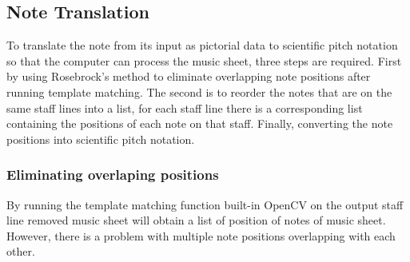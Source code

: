 \documentclass[final]{cvpr}
\begin{document}

\subsection{Note Translation}

To translate the note from its input as pictorial data to scientific pitch
notation so that the computer can process the music sheet, three steps are
required. First by using Rosebrock's method \cite{Rosebrock} to eliminate overlapping
note positions after running template matching. The second is to reorder the
notes that are on the same staff lines into a list, for each staff line there is
a corresponding list containing the positions of each note on that staff.
Finally, converting the note positions into scientific pitch notation.

\subsubsection{Eliminating overlaping positions}
By running the template matching function built-in OpenCV on the output staff
line removed music sheet will obtain a list of position of notes of music sheet.
However, there is a problem with multiple note positions overlapping with each
other.
\end{document}
